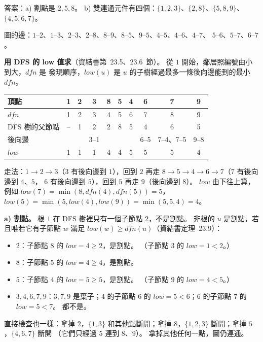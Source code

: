 \begin{pastsoln}
答案：a) 割點是 $2, 5, 8$。 b) 雙連通元件有四個：$\{1, 2, 3\}$、$\{2, 8\}$、$\{5, 8, 9\}$、$\{4, 5, 6, 7\}$。

圖的邊：$1$--$2$、$1$--$3$、$2$--$3$、$2$--$8$、$8$--$9$、$8$--$5$、$9$--$5$、$4$--$5$、$4$--$6$、$4$--$7$、
$5$--$6$、$5$--$7$、$6$--$7$。

\textbf{用 DFS 的 low 值求}（資結書第~23.5、23.6~節）。 從 $1$ 開始，鄰居照編號由小到大，$\mathit{dfn}$ 是
發現順序，$\mathit{low}(u)$ 是 $u$ 的子樹經過最多一條後向邊能到的最小 $\mathit{dfn}$。
\begin{center}
\small
\begin{tabular}{lccccccccc}
\toprule
頂點 & 1 & 2 & 3 & 8 & 5 & 4 & 6 & 7 & 9 \\
\midrule
$\mathit{dfn}$ & 1 & 2 & 3 & 4 & 5 & 6 & 7 & 8 & 9 \\
DFS 樹的父節點 & -- & 1 & 2 & 2 & 8 & 5 & 4 & 6 & 5 \\
後向邊 & & & 3--1 & & & & 6--5 & 7--4、7--5 & 9--8 \\
$\mathit{low}$ & 1 & 1 & 1 & 4 & 4 & 5 & 5 & 5 & 4 \\
\bottomrule
\end{tabular}
\end{center}
走法：$1 \to 2 \to 3$（$3$ 有後向邊到 $1$），回到 $2$ 再走 $8 \to 5 \to 4 \to 6 \to 7$（$7$ 有後向邊到 $4$、$5$，
$6$ 有後向邊到 $5$），回到 $5$ 再走 $9$（後向邊到 $8$）。 $\mathit{low}$ 由下往上算，例如
$\mathit{low}(7) = \min(8, \mathit{dfn}(4), \mathit{dfn}(5)) = 5$，$\mathit{low}(5) = \min(5, \mathit{low}(4), \mathit{low}(9)) = \min(5, 5, 4) = 4$。

\textbf{a) 割點。} 根 $1$ 在 DFS 樹裡只有一個子節點 $2$，不是割點。 非根的 $u$ 是割點，若且唯若它有子節點
$w$ 滿足 $\mathit{low}(w) \ge \mathit{dfn}(u)$（資結書定理~23.9）：
\begin{itemize}
\item $2$：子節點 $8$ 的 $\mathit{low} = 4 \ge 2$，是割點。 （子節點 $3$ 的 $\mathit{low} = 1 < 2$。）
\item $8$：子節點 $5$ 的 $\mathit{low} = 4 \ge 4$，是割點。
\item $5$：子節點 $4$ 的 $\mathit{low} = 5 \ge 5$，是割點。 （子節點 $9$ 的 $\mathit{low} = 4 < 5$。）
\item $3, 4, 6, 7, 9$：$3, 7, 9$ 是葉子；$4$ 的子節點 $6$ 的 $\mathit{low} = 5 < 6$；$6$ 的子節點 $7$ 的
$\mathit{low} = 5 < 7$。 都不是。
\end{itemize}
直接檢查也一樣：拿掉 $2$，$\{1, 3\}$ 和其他點斷開；拿掉 $8$，$\{1, 2, 3\}$ 斷開；拿掉 $5$，$\{4, 6, 7\}$ 斷開
（它們只經過 $5$ 連到 $8$、$9$）。 拿掉其他任何一點，圖仍連通。


\end{pastsoln}
